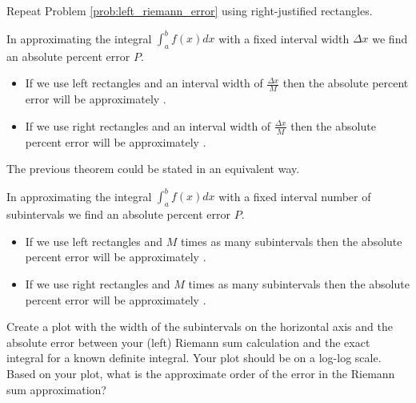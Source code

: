 \begin{problem}
    Repeat Problem \ref{prob:left_riemann_error} using right-justified rectangles.  
\end{problem}


\begin{thm}
    In approximating the integral $\int_a^b f(x) dx$ with a fixed interval width $\Delta
    x$ we find an absolute percent error $P$.
    \begin{itemize}
    \item If we use left rectangles and an interval width of $\frac{\Delta x}{M}$ then the
        absolute percent error will be approximately \underline{\hspace{1in}}.
    \item If we use right rectangles and an interval width of $\frac{\Delta x}{M}$ then the
        absolute percent error will be approximately \underline{\hspace{1in}}.
    \end{itemize}
\end{thm}

The previous theorem could be stated in an equivalent way.

\begin{thm}
    In approximating the integral $\int_a^b f(x) dx$ with a fixed interval number of
    subintervals we find an absolute percent error $P$.
    \begin{itemize}
    \item If we use left rectangles and $M$ times as many subintervals then the
        absolute percent error will be approximately \underline{\hspace{1in}}.
    \item If we use right rectangles and $M$ times as many subintervals then the
        absolute percent error will be approximately \underline{\hspace{1in}}.
    \end{itemize}
\end{thm}

\begin{problem}
    Create a plot with the width of the subintervals on the horizontal axis and the
    absolute error between your (left) Riemann sum calculation and the exact integral for
    a known definite integral.  Your plot should be on a log-log scale.  Based on your
    plot, what is the approximate order of the error in the Riemann sum approximation?
\end{problem}


